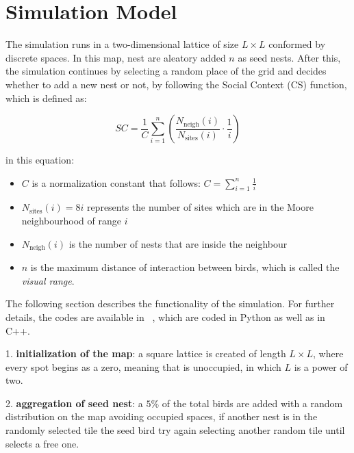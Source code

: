 \documentclass[aps,twocolumn,pre]{revtex4-2}
\begin{document}
\section{Simulation Model}
\label{Modelo}

The simulation runs in a two-dimensional lattice of size $L \times L$ conformed by discrete spaces. In this map, nest are aleatory added $n$ as seed nests. After this, the simulation continues by selecting a random place of the grid and decides whether to add a new nest or not, by following the Social Context (CS) function, which is defined as:

\begin{equation*}
    SC = \frac{1}{C} \sum_{i=1}^{n} \left( \frac{N_{\text{neigh}}(i)}{N_{\text{sites}}(i)} \cdot \frac{1}{i} \right)
\end{equation*}

in this equation:
\begin{itemize}
\item $C$ is a normalization constant that follows: $C = \sum_{i=1}^{n} \frac{1}{i}$

\item $N_{\text{sites}}(i) = 8i$ represents the number of sites which are in the Moore neighbourhood of range $i$

\item $N_{\text{neigh}}(i)$ is the number of nests that are inside the neighbour

\item $n$ is the maximum distance of interaction between birds, which is called the \textit{visual range}.
\end{itemize}
\vspace{0.5em}

The following section describes the functionality of the simulation. For further details, the codes are available in ~\cite{Lucho_codigos}, which are coded in Python as well as in C++.


\vspace{1em}

1. \textbf{initialization of the map}: a square lattice is created of length $L \times L$, where every spot begins as a zero, meaning that is unoccupied, in which $L$ is a power of two. 

2. \textbf{aggregation of seed nest}: a $5\%$ of the total birds are added with a random distribution on the map avoiding occupied spaces, if another nest is in the randomly selected tile the seed bird try again selecting another random tile until selects a free one.
\end{document}
